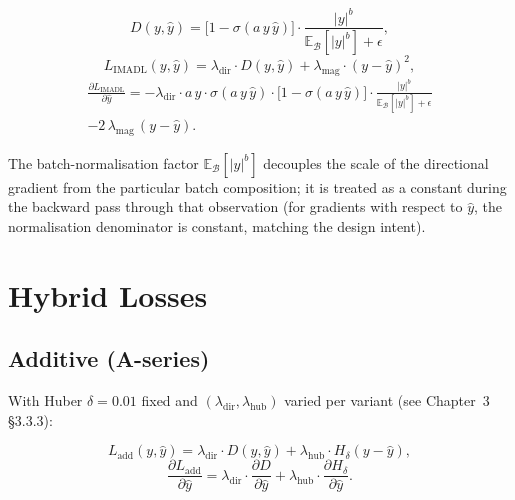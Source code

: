 \begin{equation}
D(y, \hat y) = \big[1 - \sigma(a\, y\, \hat y)\big] \cdot \frac{|y|^b}{\mathbb{E}_{\mathcal{B}}[|y|^b] + \epsilon},
\end{equation}
\begin{equation}
L_{\mathrm{IMADL}}(y, \hat y) = \lambda_{\mathrm{dir}} \cdot D(y, \hat y) + \lambda_{\mathrm{mag}} \cdot (y - \hat y)^2,
\end{equation}
\begin{multline}
\frac{\partial L_{\mathrm{IMADL}}}{\partial \hat y}
= -\lambda_{\mathrm{dir}} \cdot a\, y \cdot \sigma(a\, y\, \hat y) \cdot \big[1 - \sigma(a\, y\, \hat y)\big] \cdot \frac{|y|^b}{\mathbb{E}_{\mathcal{B}}[|y|^b] + \epsilon} \\
- 2\,\lambda_{\mathrm{mag}}\,(y - \hat y).
\end{multline}

The batch-normalisation factor $\mathbb{E}_{\mathcal{B}}[|y|^b]$ decouples the scale of the directional gradient from the particular batch composition; it is treated as a constant during the backward pass through that observation (for gradients with respect to $\hat y$, the normalisation denominator is constant, matching the design intent).

\section{Hybrid Losses}

\label{sec:hybrid-losses}

\subsection{Additive (A-series)}

\label{subsec:additive}

With Huber $\delta = 0.01$ fixed and $(\lambda_{\mathrm{dir}}, \lambda_{\mathrm{hub}})$ varied per variant (see Chapter~3 \S3.3.3):

\begin{equation}
L_{\mathrm{add}}(y, \hat y) = \lambda_{\mathrm{dir}} \cdot D(y, \hat y) + \lambda_{\mathrm{hub}} \cdot H_\delta(y - \hat y),
\end{equation}
\begin{equation}
\frac{\partial L_{\mathrm{add}}}{\partial \hat y}
= \lambda_{\mathrm{dir}} \cdot \frac{\partial D}{\partial \hat y}
+ \lambda_{\mathrm{hub}} \cdot \frac{\partial H_\delta}{\partial \hat y}.
\end{equation}

